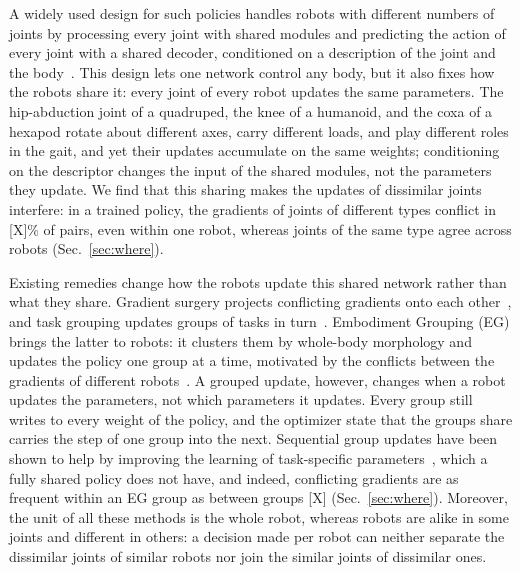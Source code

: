 %


A widely used design for such policies handles robots with different numbers of joints by processing every joint
with shared modules and predicting the action of every joint with a shared decoder, conditioned on a description of
the joint and the body~\citep{huang2020smp,gupta2022metamorph,bohlinger2024onepolicy}. This design lets one network
control any body, but it also fixes how the robots share it: every joint of every robot updates the same parameters.
The hip-abduction joint of a quadruped, the knee of a humanoid, and the coxa of a hexapod rotate about different axes,
carry different loads, and play different roles in the gait, and yet their updates accumulate on the same weights;
conditioning on the descriptor changes the input of the shared modules, not the parameters they update. We find that
this sharing makes the updates of dissimilar joints interfere: in a trained policy, the gradients of joints of
different types conflict in [X]\% of pairs, even within one robot, whereas joints of the same type agree across
robots (Sec.~\ref{sec:where}).

Existing remedies change how the robots update this shared network rather than what they share. Gradient surgery
projects conflicting gradients onto each other~\citep{yu2020pcgrad}, and task grouping updates groups of tasks in
turn~\citep{jeong2025sel}. Embodiment Grouping (EG) brings the latter to robots: it clusters them by whole-body
morphology and updates the policy one group at a time, motivated by the conflicts between the gradients of different
robots~\citep{abe2026crossembodimentoffline}. A grouped update, however, changes when a robot updates the parameters,
not which parameters it updates. Every group still writes to every weight of the policy, and the optimizer state that
the groups share carries the step of one group into the next. Sequential group updates have been shown to help by
improving the learning of task-specific parameters~\citep{jeong2025sel}, which a fully shared policy does not have,
and indeed, conflicting gradients are as frequent within an EG group as between groups [X] (Sec.~\ref{sec:where}).
Moreover, the unit of all these methods is the whole robot, whereas robots are alike in some joints and different in
others: a decision made per robot can neither separate the dissimilar joints of similar robots nor join the similar
joints of dissimilar ones.

